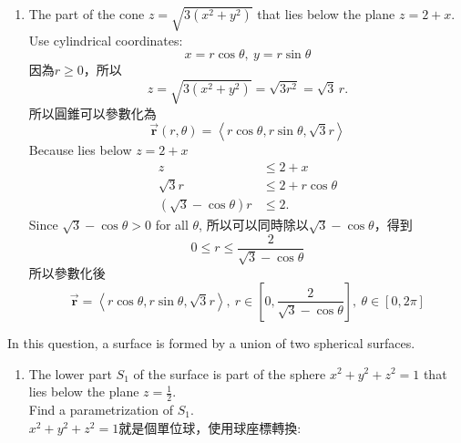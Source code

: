 ﻿\documentclass[12pt,a4paper]{article}
\begin{document}
\begin{problems}
\begin{enumerate}
  所以
  \begin{equation}
    z=1+\sqrt{1-r^2}
  \end{equation}
  最後得到
  \begin{equation}
    \vec{\mathbf{r}}(r,\theta) = \left<r\cos\theta,~r\sin\theta,~1+\sqrt{1-r^2}\right>,~0\leq r\leq1,~0\leq\theta\leq2\pi
  \end{equation}
  \item The part of the cone $z = \sqrt{3\left(x^2+y^2\right)}$ that lies below the plane $z=2+x$.\\
  Use cylindrical coordinates:
  \begin{equation}
    x=r\cos\theta,~
    y=r\sin\theta
  \end{equation}
  因為$r\geq0$，所以
  \begin{equation}
    z=\sqrt{3(x^2+y^2)}=\sqrt{3r^2}=\sqrt{3}\,r.
  \end{equation}
  所以圓錐可以參數化為
  \begin{equation}
    \vec{\mathbf{r}}(r,\theta) = \left<
      r\cos\theta, r\sin\theta, \sqrt{3}r
    \right>
  \end{equation}
  Because lies below $z = 2+x$
  \begin{align}
    z&\leq2+x \nonumber\\
    \sqrt{3}r&\leq2+r\cos\theta \nonumber\\
    (\sqrt{3}-\cos\theta)r&\leq2.
  \end{align}
  Since $\sqrt{3}-\cos\theta>0$ for all $\theta$, 所以可以同時除以$\sqrt{3}-\cos\theta$，得到
  \begin{equation}
    0 \leq r \leq \frac{2}{\sqrt{3}-\cos\theta}
  \end{equation}
  所以參數化後
  \begin{equation}
    \vec{\mathbf{r}} = \left<
      r\cos\theta, r\sin\theta, \sqrt{3}r
    \right>,~r\in\left[0,\frac{2}{\sqrt{3}-\cos\theta}\right],~\theta\in[0,2\pi]
  \end{equation}
\end{enumerate}
\problem{}
In this question, a surface is formed by a union of two spherical surfaces.
\begin{enumerate}
  \item The lower part $S_1$ of the surface is part of the sphere $x^2+y^2+z^2=1$ that lies below the plane $z=\frac{1}{2}$.\\
  Find a parametrization of $S_1$.\\
  $x^2+y^2+z^2=1$就是個單位球，使用球座標轉換:
  \begin{equation}

\end{equation}
\end{enumerate}
\end{problems}
\end{document}
